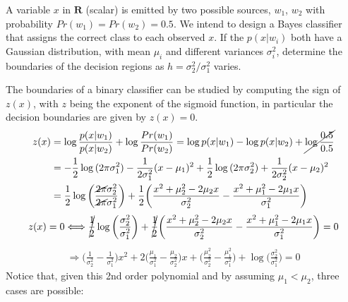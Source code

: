 \Exercise[number={1}]
A variable \(x\) in \(\mathbf{R}\) (scalar) is emitted by two possible sources,
\(w_1\), \(w_2\) with probability \(Pr(w_1)=Pr(w_2)=0.5\). 
We intend to design a Bayes classifier that assigns the correct class to each
observed \(x\). If the \(p(x|w_i)\) both have a Gaussian distribution, with
mean \(\mu_i\) and different variances \(\sigma_i^2\), determine the
boundaries of the decision regions as \(h=\sigma_2^2 / \sigma_1^2\)
varies.

\Answer[number={1}]
The boundaries of a binary classifier can be studied by computing the
sign of \(z(x)\), with \(z\) being the exponent of the sigmoid function, in
particular the decision boundaries are given by \(z(x)=0\).
\begin{align*}
    z(x)
    &=\log{\frac{p(x|w_1)}{p(x|w_2)}} + \log{\frac{Pr(w_1)}{Pr(w_2)}}
    =\log{p(x|w_1)}-\log{p(x|w_2)}+\cancel{\log{\frac{0.5}{0.5}}}\\
    &=-\frac{1}{2}\log{(2\pi\sigma_1^2)}-\frac{1}{2\sigma_1^2}(x-\mu_1)^2+\frac{1}{2}\log{(2\pi\sigma_2^2)}+\frac{1}{2\sigma_2^2}(x-\mu_2)^2\\
    &=\frac{1}{2}\log{\biggl(\frac{\cancel{2\pi}\sigma_2^2}{\cancel{2\pi}\sigma_1^2}\biggr)}+\frac{1}{2}\biggl(\frac{x^2+\mu_2^2-2\mu_2x}{\sigma_2^2}-\frac{x^2+\mu_1^2-2\mu_1x}{\sigma_1^2}\biggr)
\end{align*}
\begin{align*}
    z(x)=0 \Longleftrightarrow \cancel{\frac{1}{2}}\log{\biggl(\frac{\sigma_2^2}{\sigma_1^2}\biggr)}+\cancel{\frac{1}{2}}\biggl(\frac{x^2+\mu_2^2-2\mu_2x}{\sigma_2^2}-\frac{x^2+\mu_1^2-2\mu_1x}{\sigma_1^2}\biggr)=0
\end{align*}
\begin{align*}
    \Rightarrow
    \biggl(\frac{1}{\sigma_2^2}-\frac{1}{\sigma_1^2}\biggr)x^2+
    2\biggl(\frac{\mu_1}{\sigma_1^2}-\frac{\mu_2}{\sigma_2^2}\biggr)x+
    \biggl(\frac{\mu_2^2}{\sigma_2^2}-\frac{\mu_1^2}{\sigma_1^2}\biggr)+
    \log{\biggl(\frac{\sigma_2^2}{\sigma_1^2}\biggr)}
    =0
\end{align*}
Notice that, given this 2nd order polynomial and by assuming \(\mu_1<\mu_2\),
three cases are possible:\\
